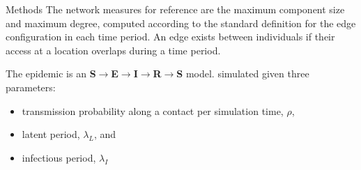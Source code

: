 \documentclass[final]{beamer} %
\newenvironment{oneCol}{\begin{column}[t]{0.225\paperwidth}}{\end{column}}
\begin{document}
\begin{frame}{}
\begin{columns}[t]
\begin{oneCol}
\begin{block}{Methods}
The network measures for reference are the maximum component size and maximum degree, computed according to the standard definition for the edge configuration in each time period.  An edge exists between individuals if their access at a location overlaps during a time period.

The epidemic is an \textbf{S$\rightarrow$E$\rightarrow$I$\rightarrow$R$\rightarrow$S} model. simulated given three parameters:\begin{itemize}
\item transmission probability along a contact per simulation time, $\rho$,
\item latent period, $\lambda_L$, and
\item infectious period, $\lambda_I$
\end{itemize}


\end{block}
\end{oneCol}
\end{columns}
\end{frame}
\end{document}

